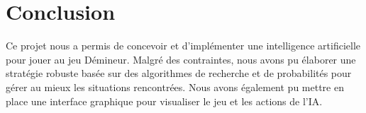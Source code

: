 \chapter{Conclusion}
\label{cp:conclusion}

Ce projet nous a permis de concevoir et d'implémenter une intelligence artificielle pour jouer au jeu Démineur.
Malgré des contraintes, nous avons pu élaborer une stratégie robuste basée sur des algorithmes de recherche et de probabilités pour gérer au mieux les situations rencontrées.
Nous avons également pu mettre en place une interface graphique pour visualiser le jeu et les actions de l'IA.
